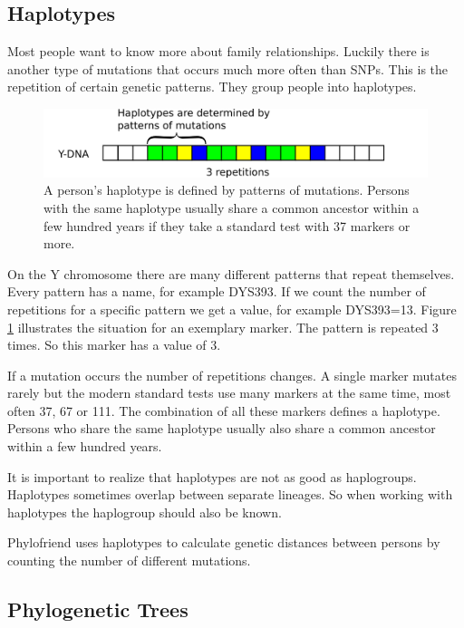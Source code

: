 \subsection{Haplotypes}

Most people want to know more about family relationships.
Luckily there is another type of mutations that occurs much
more often than SNPs. This is the repetition of certain
genetic patterns. They group people into haplotypes.

\begin{figure}[ht]
\centering
\includegraphics[width=13cm]{img/haplotypes.png}
\caption{\label{haplotype} A person's haplotype is defined
by patterns of mutations. Persons with the same haplotype
usually share a common ancestor within a few hundred years
if they take a standard test with 37 markers or more.}
\end{figure}

On the Y chromosome there are many different patterns that
repeat themselves. Every pattern has a name, for example DYS393.
If we count the number of repetitions for a specific pattern
we get a value, for example DYS393=13. Figure \ref{haplotype}
illustrates the situation for an exemplary marker. The pattern
is repeated 3 times. So this marker has a value of 3.

If a mutation occurs the number of repetitions changes. A 
single marker mutates rarely but the modern standard tests
use many markers at the same time, most often 37, 67 or
111. The combination of all these markers defines
a haplotype. Persons who share the same haplotype usually
also share a common ancestor within a few hundred years.

It is important to realize that haplotypes are not as good
as haplogroups. Haplotypes sometimes overlap between separate
lineages. So when working with haplotypes the haplogroup
should also be known.

Phylofriend uses haplotypes to calculate genetic distances
between persons by counting the number of different mutations.


\subsection{Phylogenetic Trees}

